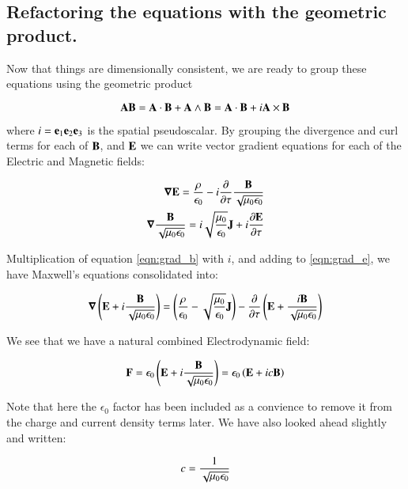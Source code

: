 \documentclass{article}      %
\newcommand{\spacegrad}[0]{\boldsymbol{\nabla}}
\begin{document}
\subsection{ Refactoring the equations with the geometric product. }

Now that things are dimensionally consistent, we are ready to group these equations using the geometric product

\begin{equation}
\mathbf{A} \mathbf{B} = \mathbf{A} \cdot \mathbf{B} + \mathbf{A} \wedge \mathbf{B} = \mathbf{A} \cdot \mathbf{B} + i \mathbf{A} \times \mathbf{B}
\end{equation}

where $i = \mathbf{e}_1\mathbf{e}_2\mathbf{e}_3$ is the spatial pseudoscalar.  By grouping the divergence and curl terms for each of $\mathbf{B}$, and $\mathbf{E}$ we can write vector gradient equations
for each of the Electric and Magnetic fields:

\begin{align}
\spacegrad \BE = \frac{\rho}{\epsilon_0} - i \frac{\partial}{\partial \tau} \frac{\BB}{\sqrt{\mu_0\epsilon_0}} \label{eqn:grad_e} \\
\spacegrad \frac{\BB}{\sqrt{\mu_0\epsilon_0}} = i\sqrt{\frac{\mu_0}{\epsilon_0}} \BJ + i\frac{\partial \BE}{\partial \tau} \label{eqn:grad_b}
\end{align}

Multiplication of equation \ref{eqn:grad_b} with $i$, and adding to \ref{eqn:grad_e}, we have Maxwell's equations consolidated into:

\begin{equation}\label{eqn:maxwelleb}
\spacegrad \left(\BE + i \frac{\BB}{\sqrt{\mu_0\epsilon_0}}\right) =
\left(\frac{\rho}{\epsilon_0} - \sqrt{\frac{\mu_0}{\epsilon_0}} \BJ\right)
- \frac{\partial}{\partial \tau} \left(\BE + \frac{i\BB}{\sqrt{\mu_0\epsilon_0}} \right)
\end{equation}

We see that we have a natural combined Electrodynamic field:

\begin{equation}
\mathbf{F} = \epsilon_0\left(\mathbf{E} + i \frac{\mathbf{B}}{\sqrt{\mu_0\epsilon_0}}\right) = \epsilon_0\left(\mathbf{E} + i c \mathbf{B}\right)
\end{equation}

Note that here the $\epsilon_0$ factor has been included as a convience to remove it from the charge and current density terms later.  We have also looked ahead slightly and written:

\begin{equation}
c = \frac{1}{\sqrt{\mu_0\epsilon_0}}
\end{equation}
\end{document}
